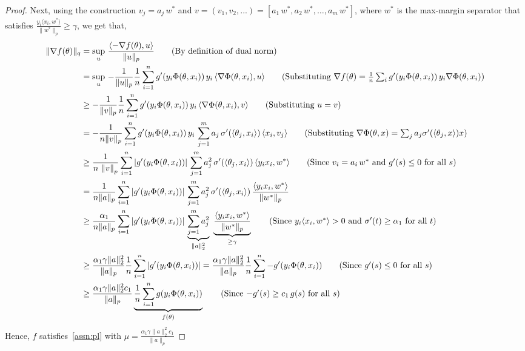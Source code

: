 \documentclass{article}
\newcommand{\norm}[1]{\left\|#1 \right\|}
\begin{document}
\begin{proof}
Next, using the construction $v_j = a_j \, w^*$ and $v = (v_1,v_2,...) = [a_1 \, w^*, a_2 \, w^* , \ldots, a_m \, w^*]$,  where $w^*$ is the max-margin separator that satisfies $\frac{y_i\langle x_i,w^*\rangle}{\|w^*\|_p}\geq \gamma$, we get that, 
\begin{align*}
    \|\nabla f(\theta) \|_q &=\sup_u \, \frac{\langle -\nabla f(\theta), u\rangle}{\|u\|_p} \tag{By definition of dual norm} \\
    &= \sup_u\,  -\frac{1}{\|u\|_p} \frac{1}{n} \sum_{i=1}^n g'(y_i \Phi(\theta, x_i ))\, y_i\, \langle\nabla \Phi(\theta, x_i ), u \rangle \tag{Substituting $\nabla f(\theta) = \frac{1}{n} \sum_{i} g'(y_i \Phi(\theta, x_i ))\, y_i\nabla \Phi(\theta, x_i )$}\\
    &\geq  -\frac{1}{\|v\|_p} \frac{1}{n} \sum_{i=1}^n g'(y_i \Phi(\theta, x_i ))\, y_i\, \langle\nabla \Phi(\theta, x_i ), v \rangle \tag{Substituting $u = v$}\\
    &=  -\frac{1}{n \|v\|_p} \sum_{i=1}^n g'(y_i \Phi(\theta, x_i )) \, y_i \, \sum_{j=1}^m a_j \, \sigma'(\langle \theta_j,x_i\rangle) \,  \langle x_i, v_j \rangle \tag{Substituting $\nabla \Phi(\theta,x) = \sum_{j} a_j \sigma'(\langle \theta_j,x\rangle) x$}\\
    &\geq \frac{1}{n \, \norm{v}_p} \sum_{i=1}^n |g'(y_i \Phi(\theta, x_i )) |\, \sum_{j=1}^m a^2_j  \, \sigma'(\langle \theta_j, x_i \rangle) \, \langle y_i x_i, w^* \rangle \tag{Since $v_i = a_i \, w^*$ and $g'(s) \leq 0$ for all $s$}\\
    & = \frac{1}{n \|a\|_p} \sum_{i=1}^n |g'(y_i \Phi(\theta, x_i )) |\, \sum_{j=1}^m a^2_j \, \sigma'(\langle \theta_j, x_i \rangle) \, \frac{ \langle y_i x_i, w^* \rangle }{\|w^*\|_p} \\
    &\geq  \frac{\alpha_1}{n \|a\|_p} \sum_{i=1}^n |g'(y_i \Phi(\theta, x_i )) |\, \underbrace{\sum_{j=1}^m a^2_j }_{\|a\|_2^2} \ \underbrace{ \frac{ \langle y_i x_i, w^* \rangle }{\|w^*\|_p}}_{\geq \gamma}\tag{Since $y_i \langle x_i, w^* \rangle > 0$ and $\sigma'(t) \geq \alpha_1$ for all $t$}\\
     &\geq \frac{\alpha_1 \gamma  \|a\|_2^2}{\|a\|_p} \frac{1}{n}\sum_{i=1}^n |g'(y_i \Phi(\theta, x_i ))| = \frac{\alpha_1 \gamma  \|a\|_2^2}{\|a\|_p} \frac{1}{n}\sum_{i=1}^n -g'(y_i \Phi(\theta, x_i )) \tag{Since $g'(s) \leq 0$ for all $s$} \\
     &\geq \frac{\alpha_1 \gamma  \|a\|_2^2 c_1}{\|a\|_p} \underbrace{\frac{1}{n}\sum_{i=1}^n g(y_i \Phi(\theta, x_i ))}_{f(\theta)}\tag{Since $-g'(s) \geq c_1 \, g(s)$ for all $s$}
\end{align*}
Hence, $f$ satisfies~\cref{assn:pl} with $\mu = \frac{\alpha_1 \gamma  \|a\|_2^2 c_1}{\|a\|_p}$
\end{proof}
\end{document}
